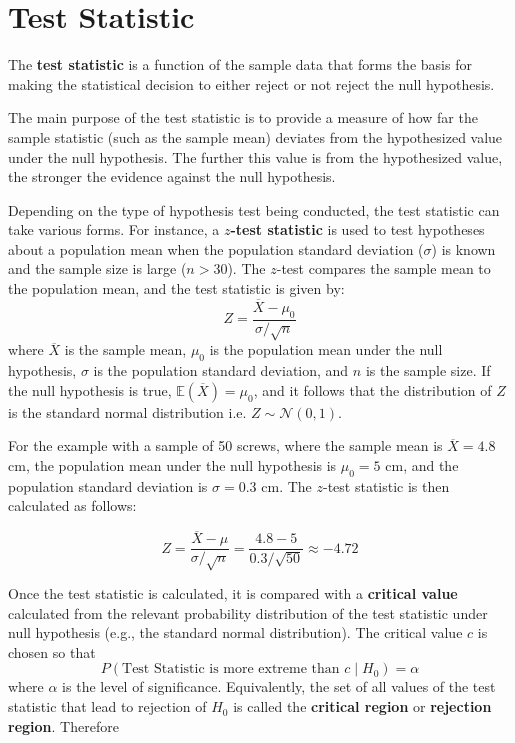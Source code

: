 \documentclass[twoside]{book}
\begin{document}
\section{Test Statistic}
\begin{textbox}
The \textbf{test statistic} is a function of the sample data that forms the basis for making the statistical decision to either reject or not reject the null hypothesis.
\end{textbox}

The main purpose of the test statistic is to provide a measure of how far the sample statistic (such as the sample mean) deviates from the hypothesized value under the null hypothesis. The further this value is from the hypothesized value, the stronger the evidence against the null hypothesis.

Depending on the type of hypothesis test being conducted, the test statistic can take various forms. For instance, a \textbf{$ z $-test statistic} is used to test hypotheses about a population mean when the population standard deviation ($\sigma$) is known and the sample size is large ($n > 30$). The $ z $-test compares the sample mean to the population mean, and the test statistic is given by:
    \[
    Z = \dfrac{\overline{X} - \mu_0}{{\sigma}/{\sqrt{n}}}
    \]
where $\overline{X}$ is the sample mean, $\mu_0$ is the population mean under the null hypothesis, $\sigma$ is the population standard deviation, and $n$ is the sample size. If the null hypothesis is true, $ \mathbb{E}(\overline{X}) = \mu_0 $, and it follows that the distribution of $ Z $ is the standard normal distribution i.e. $Z \sim \mathcal{N}(0,1)$.

For the example with a sample of 50 screws, where the sample mean is $\overline{X} = 4.8$ cm, the population mean under the null hypothesis is $\mu_0 = 5$ cm, and the population standard deviation is $\sigma = 0.3$ cm. The $ z $-test statistic is then calculated as follows:

\[
Z = \dfrac{\overline{X} - \mu}{{\sigma}/{\sqrt{n}}} = \frac{4.8 - 5}{{0.3}/{\sqrt{50}}} \approx -4.72
\]

Once the test statistic is calculated, it is compared with a \textbf{critical value} calculated from the relevant probability distribution of the test statistic under null hypothesis (e.g., the standard normal distribution). The critical value \(c\) is chosen so that
\[
P(\text{Test Statistic is more extreme than }c \mid H_0) = \alpha
\]
where \(\alpha\) is the level of significance.  Equivalently, the set of all values of the test statistic that lead to rejection of \(H_0\) is called the \textbf{critical region} or \textbf{rejection region}. Therefore
\end{document}
